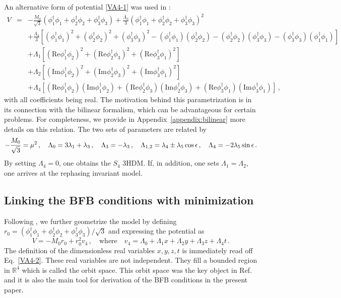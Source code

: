 \documentclass[11pt]{article}
\renewcommand{\Re}{\mathrm{Re }}
\renewcommand{\Im}{\mathrm{Im }}
\begin{document}
An alternative form of potential \eqref{VA4-1} was used in \cite{Degee:2012sk}:
\begin{eqnarray}
V&=&-\frac{M_0}{\sqrt{3}}\left(\phi_1^{\dagger}\phi_1+\phi_2^{\dagger}\phi_2+\phi_3^{\dagger}\phi_3\right)+\frac{\Lambda_0}{3}\left(\phi_1^{\dagger}\phi_1+\phi_2^{\dagger}\phi_2+\phi_3^{\dagger}\phi_3\right)^2\nonumber\\ 
&&+\frac{\Lambda_3}{3}\left[(\phi_1^{\dagger}\phi_1)^2+(\phi_2^{\dagger}\phi_2)^2+(\phi_3^{\dagger}\phi_3)^2-(\phi_1^{\dagger}\phi_1)(\phi_2^{\dagger}\phi_2)-(\phi_2^{\dagger}\phi_2)(\phi_3^{\dagger}\phi_3)-(\phi_3^{\dagger}\phi_3)(\phi_1^{\dagger}\phi_1)\right]\nonumber\\
&&+\Lambda_1\left[(\Re\phi_1^{\dagger}\phi_2)^2+(\Re\phi_2^{\dagger}\phi_3)^2+(\Re\phi_3^{\dagger}\phi_1)^2\right]\nonumber\\
&&+\Lambda_2\left[(\Im\phi_1^{\dagger}\phi_2)^2+(\Im\phi_2^{\dagger}\phi_3)^2+(\Im\phi_3^{\dagger}\phi_1)^2\right]\nonumber \\
&&+\Lambda_4\left[(\Re\phi_1^{\dagger}\phi_2)(\Im\phi_1^{\dagger}\phi_2)+(\Re\phi_2^{\dagger}\phi_3)(\Im\phi_2^{\dagger}\phi_3)+
(\Re\phi_3^{\dagger}\phi_1)(\Im\phi_3^{\dagger}\phi_1)\right]\,,\label{VA4-2}
\end{eqnarray}
with all coefficients being real.
The motivation behind this parametrization is in its connection with the bilinear formalism, which can be advantageous
for certain problems. For completeness, we provide in Appendix~\ref{appendix:bilinear} more details on this relation.
The two sets of parameters are related by
\begin{equation}
-{M_0 \over \sqrt{3}} = \mu^2\,,\quad \Lambda_0 = 3\lambda_1 + \lambda_3 \,,\quad 
\Lambda_3 = - \lambda_3\,,\quad \Lambda_{1,2} = \lambda_4 \pm \lambda_5 \cos\epsilon\,,\quad 
\Lambda_4 = -2\lambda_5 \sin \epsilon\,.
\end{equation}
By setting $\Lambda_4 = 0$, one obtains the $S_4$ 3HDM. 
If, in addition, one sets $\Lambda_1 = \Lambda_2$, one arrives 
at the rephasing invariant model.

\subsection{Linking the BFB conditions with minimization} 

Following \cite{Degee:2012sk}, we further geometrize the model by defining 
$r_0 = (\phi_1^{\dagger}\phi_1+\phi_2^{\dagger}\phi_2+\phi_3^{\dagger}\phi_3)/\sqrt{3}$ 
and expressing the potential as
\begin{equation}
V = -M_{0}r_{0}+r_{0}^2 v_4\,,\quad 
\mbox{where}\quad v_4 = \Lambda_{0} + \Lambda_{1} x + \Lambda_2 y + \Lambda_3 z + \Lambda_4 t\,.\label{VA4-3}
\end{equation}
The definition of the dimensionless real variables $x, y, z, t$ is immediately read off Eq.~\eqref{VA4-2}.
These real variables are not independent. They fill a bounded region in $\mathbb{R}^4$
which is called the orbit space. 
This orbit space was the key object in Ref.~\cite{Degee:2012sk} and it is also the main tool for derivation of the BFB conditions
in the present paper.
\end{document}
